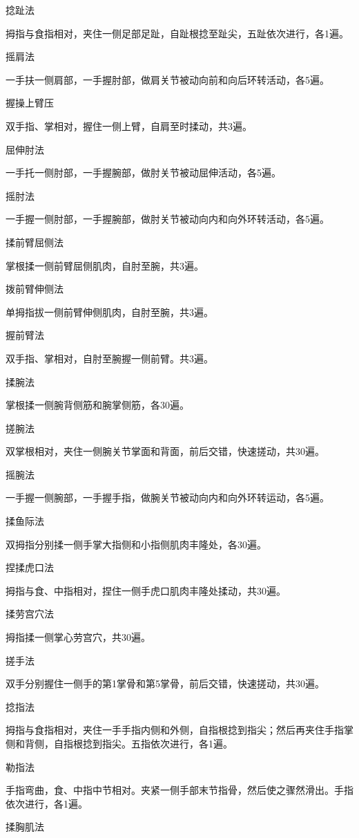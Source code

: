 \documentclass[12pt,UTF8]{ctexbook}
\begin{document}
捻趾法

拇指与食指相对，夹住一侧足部足趾，自趾根捻至趾尖，五趾依次进行，各1遍。

摇肩法

一手扶一侧肩部，一手握肘部，做肩关节被动向前和向后环转活动，各5遍。

握操上臂压

双手指、掌相对，握住一侧上臂，自肩至时揉动，共3遍。

屈伸肘法

一手托一侧肘部，一手握腕部，做肘关节被动屈伸活动，各5遍。

摇肘法

一手握一侧肘部，一手握腕部，做肘关节被动向内和向外环转活动，各5遍。

揉前臂屈侧法

掌根揉一侧前臂屈侧肌肉，自肘至腕，共3遍。

拨前臂伸侧法

单拇指拔一侧前臂伸侧肌肉，自肘至腕，共3遍。

握前臂法

双手指、掌相对，自肘至腕握一侧前臂。共3遍。

揉腕法

掌根揉一侧腕背侧筋和腕掌侧筋，各30遍。

搓腕法

双掌根相对，夹住一侧腕关节掌面和背面，前后交错，快速搓动，共30遍。

摇腕法

一手握一侧腕部，一手握手指，做腕关节被动向内和向外环转运动，各5遍。

揉鱼际法

双拇指分别揉一侧手掌大指侧和小指侧肌肉丰隆处，各30遍。

捏揉虎口法

拇指与食、中指相对，捏住一侧手虎口肌肉丰隆处揉动，共30遍。

揉劳宫穴法

拇指揉一侧掌心劳宫穴，共30遍。

搓手法

双手分别握住一侧手的第1掌骨和第5掌骨，前后交错，快速搓动，共30遍。

捻指法

拇指与食指相对，夹住一手手指内侧和外侧，自指根捻到指尖；然后再夹住手指掌侧和背侧，自指根捻到指尖。五指依次进行，各1遍。

勒指法

手指弯曲，食、中指中节相对。夹紧一侧手部末节指骨，然后使之骤然滑出。手指依次进行，各1遍。

揉胸肌法
\end{document}
